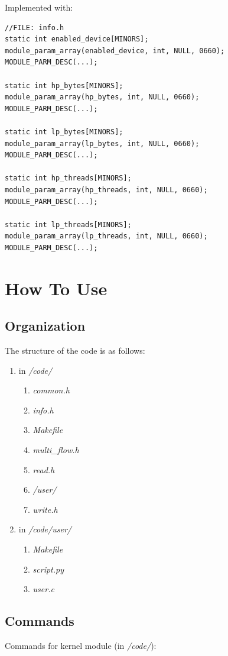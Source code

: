 \documentclass[12pt]{report}
\begin{document}
Implemented with:

\begin{lstlisting}
//FILE: info.h
static int enabled_device[MINORS];
module_param_array(enabled_device, int, NULL, 0660);
MODULE_PARM_DESC(...);

static int hp_bytes[MINORS];
module_param_array(hp_bytes, int, NULL, 0660);
MODULE_PARM_DESC(...);

static int lp_bytes[MINORS];
module_param_array(lp_bytes, int, NULL, 0660);
MODULE_PARM_DESC(...);

static int hp_threads[MINORS];
module_param_array(hp_threads, int, NULL, 0660);
MODULE_PARM_DESC(...);

static int lp_threads[MINORS];
module_param_array(lp_threads, int, NULL, 0660);
MODULE_PARM_DESC(...);
\end{lstlisting}
\chapter{How To Use}

\section{Organization}
The structure of the code is as follows:

\begin{enumerate}
	\item in \emph{/code/}
		\begin{enumerate}
			\item \emph{common.h}
			\item \emph{info.h}
			\item \emph{Makefile}
			\item \emph{multi\_flow.h}
			\item \emph{read.h}
			\item \emph{/user/}
			\item \emph{write.h}
		\end{enumerate}
	\item in \emph{/code/user/}
		\begin{enumerate}
			\item \emph{Makefile}
			\item \emph{script.py}
			\item \emph{user.c}
		\end{enumerate}
\end{enumerate}

\section{Commands}
Commands for kernel module (in \emph{/code/}): 
\end{document}
